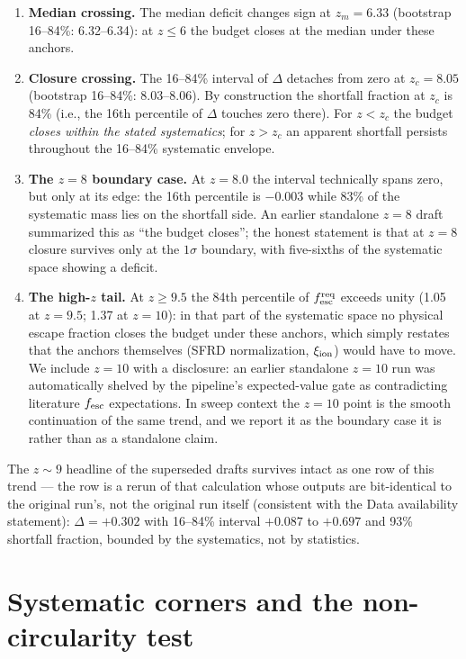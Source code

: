 \documentclass[twocolumn]{aastex702}
\begin{document}
\begin{enumerate}
\item \textbf{Median crossing.} The median deficit changes sign at $z_m=6.33$ (bootstrap 16--84\%: 6.32--6.34): at $z\le6$ the budget closes at the median under these anchors.
\item \textbf{Closure crossing.} The 16--84\% interval of $\Delta$ detaches from zero at $z_c=8.05$ (bootstrap 16--84\%: 8.03--8.06). By construction the shortfall fraction at $z_c$ is 84\% (i.e., the 16th percentile of $\Delta$ touches zero there). For $z<z_c$ the budget \emph{closes within the stated systematics}; for $z>z_c$ an apparent shortfall persists throughout the 16--84\% systematic envelope.
\item \textbf{The $z=8$ boundary case.} At $z=8.0$ the interval technically spans zero, but only at its edge: the 16th percentile is $-0.003$ while 83\% of the systematic mass lies on the shortfall side. An earlier standalone $z=8$ draft summarized this as ``the budget closes''; the honest statement is that at $z=8$ closure survives only at the $1\sigma$ boundary, with five-sixths of the systematic space showing a deficit.
\item \textbf{The high-$z$ tail.} At $z\ge9.5$ the 84th percentile of $f_{\rm esc}^{\rm req}$ exceeds unity (1.05 at $z=9.5$; 1.37 at $z=10$): in that part of the systematic space no physical escape fraction closes the budget under these anchors, which simply restates that the anchors themselves (SFRD normalization, $\xi_{\rm ion}$) would have to move. We include $z=10$ with a disclosure: an earlier standalone $z=10$ run was automatically shelved by the pipeline's expected-value gate as contradicting literature $f_{\rm esc}$ expectations. In sweep context the $z=10$ point is the smooth continuation of the same trend, and we report it as the boundary case it is rather than as a standalone claim.
\end{enumerate}

The $z\sim9$ headline of the superseded drafts survives intact as one row of this trend --- the row is a rerun of that calculation whose outputs are bit-identical to the original run's, not the original run itself (consistent with the Data availability statement): $\Delta = +0.302$ with 16--84\% interval $+0.087$ to $+0.697$ and 93\% shortfall fraction, bounded by the systematics, not by statistics.

\section{Systematic corners and the non-circularity test}
\label{sec:corners}
\end{document}
